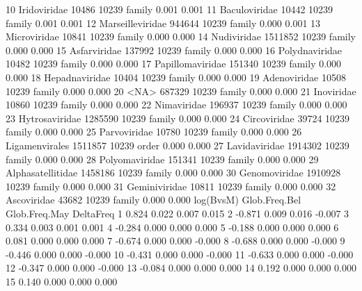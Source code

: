 \documentclass{article}
\begin{document}
\begin{Schunk}
\begin{Soutput}
10          Iridoviridae    10486  10239  family          0.001          0.001
11         Baculoviridae    10442  10239  family          0.001          0.001
12      Marseilleviridae   944644  10239  family          0.000          0.001
13          Microviridae    10841  10239  family          0.000          0.000
14           Nudiviridae  1511852  10239  family          0.000          0.000
15          Asfarviridae   137992  10239  family          0.000          0.000
16        Polydnaviridae    10482  10239  family          0.000          0.000
17      Papillomaviridae   151340  10239  family          0.000          0.000
18        Hepadnaviridae    10404  10239  family          0.000          0.000
19          Adenoviridae    10508  10239  family          0.000          0.000
20                  <NA>   687329  10239  family          0.000          0.000
21            Inoviridae    10860  10239  family          0.000          0.000
22           Nimaviridae   196937  10239  family          0.000          0.000
23        Hytrosaviridae  1285590  10239  family          0.000          0.000
24          Circoviridae    39724  10239  family          0.000          0.000
25          Parvoviridae    10780  10239  family          0.000          0.000
26        Ligamenvirales  1511857  10239   order          0.000          0.000
27         Lavidaviridae  1914302  10239  family          0.000          0.000
28        Polyomaviridae   151341  10239  family          0.000          0.000
29     Alphasatellitidae  1458186  10239  family          0.000          0.000
30         Genomoviridae  1910928  10239  family          0.000          0.000
31         Geminiviridae    10811  10239  family          0.000          0.000
32           Ascoviridae    43682  10239  family          0.000          0.000
   log(BvsM) Glob.Freq.Bel Glob.Freq.May DeltaFreq
1      0.824         0.022         0.007     0.015
2     -0.871         0.009         0.016    -0.007
3      0.334         0.003         0.001     0.001
4     -0.284         0.000         0.000     0.000
5     -0.188         0.000         0.000     0.000
6      0.081         0.000         0.000     0.000
7     -0.674         0.000         0.000    -0.000
8     -0.688         0.000         0.000    -0.000
9     -0.446         0.000         0.000    -0.000
10    -0.431         0.000         0.000    -0.000
11    -0.633         0.000         0.000    -0.000
12    -0.347         0.000         0.000    -0.000
13    -0.084         0.000         0.000     0.000
14     0.192         0.000         0.000     0.000
15     0.140         0.000         0.000     0.000

\end{Soutput}
\end{Schunk}
\end{document}
